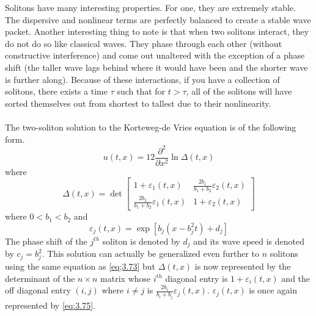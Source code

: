 \documentclass{article}
\newcommand{\pdt}[2]{\frac{\partial ^2 #1}{\partial #2 ^2}}
\numberwithin{equation}{section}
\begin{document}
Solitons have many interesting properties. For one, they are extremely stable. The dispersive and nonlinear terms are perfectly balanced to create a stable wave packet. Another interesting thing to note is that when two solitons interact, they do not do so like classical waves. They phase through each other (without constructive interference) and come out unaltered with the exception of a phase shift (the taller wave lags behind where it would have been and the shorter wave is further along). Because of these interactions, if you have a collection of solitons, there exists a time $\tau$ such that for $t>\tau$, all of the solitons will have sorted themselves out from shortest to tallest due to their nonlinearity. \\\\
The two-soliton solution to the Korteweg-de Vries equation is of the following form.
\begin{equation}
    u(t,x) =12\pdt{}{x} \ln\Delta(t,x) \label{eq;3.73}
\end{equation}
where 
\begin{equation}
    \Delta(t,x) = \det 
    \begin{bmatrix}
        1+\varepsilon_1(t,x)  &\frac{2b_1}{b_1+b_2}\varepsilon_2(t,x) \\
        \frac{2b_2}{b_1+b_2}\varepsilon_1(t,x) &1+\varepsilon_2(t,x)
    \end{bmatrix}
\end{equation}
where $0<b_1<b_2$ and 
\begin{equation}
    \varepsilon_j(t,x)=\exp[b_j(x-b_j^2t)+d_j] \label{eq:3.75}
\end{equation}
The phase shift of the $j^{th}$ soliton is denoted by $d_j$ and its wave speed is denoted by $c_j=b_j^2$. This solution can actually be generalized even further to $n$ solitons using the same equation as \eqref{eq;3.73} but $\Delta (t,x)$ is now represented by the determinant of the $n \times n$ matrix whose $i^{th}$ diagonal entry is $1+\varepsilon_i(t,x)$ and the off diagonal entry $(i,j)$ where $i\neq j$ is $\frac{2b_i}{b_i+b_j}\varepsilon_j(t,x)$. $\varepsilon_j(t,x)$ is once again represented by \eqref{eq:3.75}.
\newpage
\end{document}
